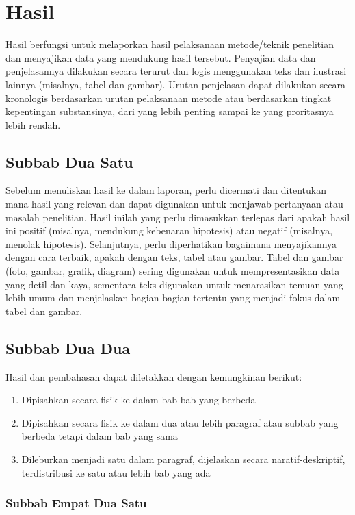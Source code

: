 
\newpage
\chapter{Hasil}
 
Hasil berfungsi untuk melaporkan hasil pelaksanaan metode/teknik penelitian dan menyajikan data yang mendukung hasil tersebut. Penyajian data dan penjelasannya dilakukan secara terurut dan logis menggunakan teks dan ilustrasi lainnya (misalnya, tabel dan gambar). Urutan penjelasan dapat dilakukan secara kronologis berdasarkan urutan pelaksanaan metode atau berdasarkan tingkat kepentingan substansinya, dari yang lebih penting sampai ke yang proritasnya lebih rendah. 

\section{Subbab Dua Satu}

Sebelum menuliskan hasil ke dalam laporan, perlu dicermati dan ditentukan mana hasil yang relevan dan dapat digunakan untuk menjawab pertanyaan atau masalah penelitian.  Hasil inilah yang perlu dimasukkan terlepas dari apakah hasil ini positif (misalnya, mendukung kebenaran hipotesis) atau negatif (misalnya, menolak hipotesis). Selanjutnya, perlu diperhatikan bagaimana menyajikannya dengan cara terbaik, apakah dengan teks, tabel atau gambar. Tabel dan gambar (foto, gambar, grafik, diagram) sering digunakan untuk mempresentasikan data yang detil dan kaya, sementara teks digunakan untuk menarasikan temuan yang lebih umum dan menjelaskan bagian-bagian tertentu yang menjadi fokus dalam tabel dan gambar. 


\section{Subbab Dua Dua}

Hasil dan pembahasan dapat diletakkan dengan kemungkinan berikut:
\begin{enumerate}
  \item	Dipisahkan secara fisik ke dalam bab-bab yang berbeda
  \item Dipisahkan secara fisik ke dalam dua atau lebih paragraf atau subbab yang berbeda tetapi dalam bab yang sama
  \item Dileburkan menjadi satu dalam paragraf, dijelaskan secara naratif-deskriptif, terdistribusi ke satu atau lebih bab yang ada
\end{enumerate}

\subsection{Subbab Empat Dua Satu}

